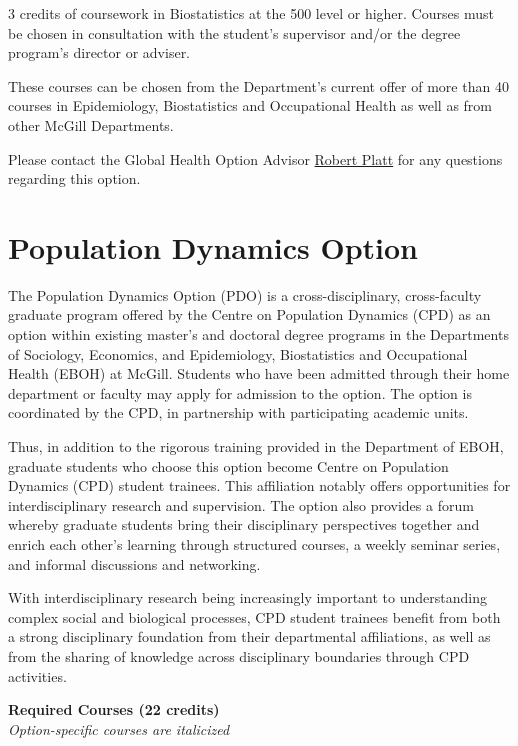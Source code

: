 \documentclass[
]{book}
\begin{document}
3 credits of coursework in Biostatistics at the 500 level or higher. Courses must be chosen in consultation with the student's supervisor and/or the degree program's director or adviser.

These courses can be chosen from the Department's current offer of more than 40 courses in Epidemiology, Biostatistics and Occupational Health as well as from other McGill Departments.

Please contact the Global Health Option Advisor \href{mailto:robert.platt@mcgill.ca}{Robert Platt} for any questions regarding this option.

\hypertarget{population-dynamics-option}{%
\section{Population Dynamics Option}\label{population-dynamics-option}}

The Population Dynamics Option (PDO) is a cross-disciplinary, cross-faculty graduate program offered by the Centre on Population Dynamics (CPD) as an option within existing master's and doctoral degree programs in the Departments of Sociology, Economics, and Epidemiology, Biostatistics and Occupational Health (EBOH) at McGill. Students who have been admitted through their home department or faculty may apply for admission to the option. The option is coordinated by the CPD, in partnership with participating academic units.

Thus, in addition to the rigorous training provided in the Department of EBOH, graduate students who choose this option become Centre on Population Dynamics (CPD) student trainees. This affiliation notably offers opportunities for interdisciplinary research and supervision. The option also provides a forum whereby graduate students bring their disciplinary perspectives together and enrich each other's learning through structured courses, a weekly seminar series, and informal discussions and networking.

With interdisciplinary research being increasingly important to understanding complex social and biological processes, CPD student trainees benefit from both a strong disciplinary foundation from their departmental affiliations, as well as from the sharing of knowledge across disciplinary boundaries through CPD activities.

\textbf{Required Courses (22 credits)}\\
\emph{Option-specific courses are italicized}
\end{document}
